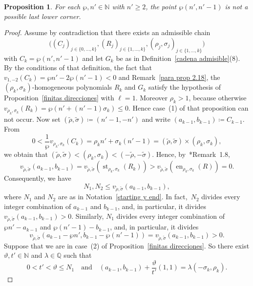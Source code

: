 \documentclass[reqno,a4paper]{amsart}
\newtheorem{proposition}[theorem]{Proposition}
\theoremstyle{definition}
\theoremstyle{remark}
\DeclareMathOperator{\en}{en}
\DeclareMathOperator{\st}{st}
\begin{document}
\begin{proposition}\label{casos imposibles} For each $\wp, n'\in\mathds{N}$ with $n'\ge 2$, the point $\wp (n',n'-1)$ is not a possible last lower corner.
\end{proposition}

\begin{proof} Assume by contradiction that there exists an admissible chain
$$
\bigl((C_j)_{j\in\{0,\dots,k\}},(R_j)_{j\in\{1,\dots,k\}},(\rho_j,\sigma_j)_{j\in\{1,\dots,k\}}\bigr)
$$
with $C_k\!=\!\wp(n',n'-1)$ and let $G_k$ be as in Definition~\ref{cadena admisible}(8). By the conditions of that de\-finition, the fact that $v_{1,-2}(C_k) = \wp n' - 2\wp (n'-1)<0$ and Remark~\ref{para prop 2.18}, the $(\rho_k,\sigma_k)$-ho\-mo\-ge\-neous polynomials $R_k$ and $G_k$ satisfy the hypothesis of Proposition~\ref{finitas direcciones} with $\ell=1$. Moreover $\rho_k > 1$, because otherwise $v_{\rho_k,\sigma_k}(R_k) = \wp (n'+(n'-1)\sigma_k)\le 0$. Hence case~(1) of that proposition can not occur. Now set $(\tilde{\rho},\tilde{\sigma})\coloneqq (n'-1,-n')$ and write $(a_{k-1},b_{k-1})\coloneqq C_{k-1}$. From
$$
0<\frac{1}{\wp } v_{\rho_k,\sigma_k}(C_k)=\rho_k n'+\sigma_k(n'-1) = (\tilde{\rho},\tilde{\sigma})\times(\rho_k,\sigma_k),
$$
we obtain that $(\tilde{\rho},\tilde{\sigma})<(\rho_k,\sigma_k)<(-\tilde{\rho},-\tilde{\sigma})$. Hence, by~\cite{GGV}*{Remark~1.8},
$$
v_{\tilde{\rho},\tilde{\sigma}}(a_{k-1},b_{k-1})= v_{\tilde{\rho},\tilde{\sigma}}(\st_{\rho_k,\sigma_k}(R_k)) > v_{\tilde{\rho},\tilde{\sigma}}(\en_{\rho_k,\sigma_k}(R))=0.
$$
Consequently, we have
\begin{equation}\label{desigualdad para N1 y N2}
N_1,N_2\le v_{\tilde{\rho},\tilde{\sigma}}(a_{k-1},b_{k-1}),
\end{equation}
where $N_1$ and $N_2$ are as in Notation~\ref{starting y end}. In fact,\ $N_2$ divides every integer combination of $a_{k-1}$ and $b_{k-1}$, and, in particular, it divides $v_{\tilde{\rho},\tilde{\sigma}}(a_{k-1},b_{k-1})>0$. Similarly, $N_1$ divides every integer combination of $\wp n'-a_{k-1}$ and $\wp (n'-1)-b_{k-1}$, and, in particular, it divides
$$
v_{\tilde{\rho},\tilde{\sigma}}(a_{k-1}-\wp n',b_{k-1}- \wp (n'-1))= v_{\tilde{\rho},\tilde{\sigma}}(a_{k-1},b_{k-1})>0.
$$
Suppose that we are in case~(2) of Proposition~\ref{finitas direcciones}. So there exist $\vartheta,t'\in \mathds{N}$ and $\lambda\in\mathds{Q}$ such that
\begin{equation}\label{desigualdades e igualdad}
0<t'< \vartheta \le N_1 \quad\text{and}\quad (a_{k-1},b_{k-1})+\frac{\vartheta}{t'}(1,1)=\lambda(-\sigma_k,\rho_k).

\end{equation}
\end{proof}
\end{document}
